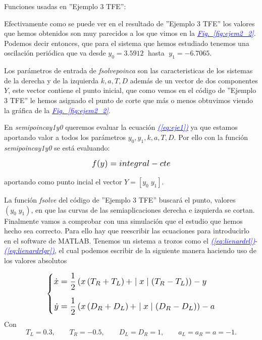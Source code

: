 \documentclass[12pt,a4paper]{report} %
\newcommand{\fref}[1]{\hyperref[#1]{\textcolor{blue}{\textit{Fig.~\ref*{#1}}}}}
\newcommand{\eref}[1]{\hyperref[#1]{\textcolor{blue}{\textit{(\ref*{#1})}}}}
\begin{document}
	\vspace{1cm}\noindent Funciones usadas en ''Ejemplo 3 TFE'':
	\vspace{0.5cm}
	\vspace{0.5cm}
	\newpage
	
	Efectivamente como se puede ver en el resultado de ''Ejemplo 3 TFE'' los valores que hemos obtenidos son muy parecidos a los que vimos en la \fref{fig:ejem2_2}. Podemos decir entonces, que para el sistema que hemos estudiado tenemos una oscilación periódica que va desde $y_0=3.5912\;$ hasta $\; y_1=-6.7065$.

	
	\vspace{0.5cm}Los parámetros de entrada de \textit{fsolvepoinca} son las caracteristicas de los sistemas de la derecha y de la izquierda $k,a,T,D$ además de un vector de dos componentes $Y$, este vector contiene el punto inicial, que como vemos en el código de ''Ejemplo 3 TFE'' le hemos asignado el punto de corte que más o menos obtuvimos viendo la gráfica de la \fref{fig:ejem2_2}.
	
	\vspace{0.5cm}En \textit{semipoincay1y0} queremos evaluar la ecuación \eref{eq:eje1} ya que estamos aportando valor a todos los parámetros $y_0,y_1,k,a,T,D$. Por ello con la función \textit{semipoincay1y0} se está evaluando:
	
	\begin{equation}
		\label{eq:eje4}
		\scalebox{1.2}{$\displaystyle
			f(y)=integral - cte
			$}
	\end{equation}\smallskip
	
	\noindent aportando como punto incial el vector $Y=\left[ y_0 \; y_1 \right]$. 
	
	\vspace{0.5cm}La función \textit{fsolve} del código de ''Ejemplo 3 TFE'' buscará el punto, valores $\left(y_0\; y_1\right)$, en que las curvas de las semiaplicaciones derecha e izquierda se cortan.
	\newpage
	Finalmente vamos a comprobar con una simulación que el estudio que hemos hecho sea correcto. Para ello hay que reescribir las ecuaciones para introducirlo en el software de MATLAB. Tenemos un sistema a trozos como el \eref{eq:lienardrl}-\eref{eq:lienardrlgr}, el cual podemos escribir de la siguiente manera haciendo uso de los valores absolutos
	
	\begin{equation}
		\label{eq:clejem}
		\scalebox{1.2}{$\displaystyle
			\left\{
			\begin{aligned}
			\dot{x}&=\frac{1}{2}\left( x\left(T_R+T_L\right)+\mid x\mid \left(T_R-T_L\right)\right)-y
				 \\[2mm]
			\dot{y}&=\frac{1}{2}\left( x\left(D_R+D_L\right)+\mid x\mid \left(D_R-D_L\right)\right)-a
			\end{aligned}
			\right. 
			$}
	\end{equation}\smallskip
	\noindent Con
	\begin{equation*}
		T_L=0.3, \qquad T_R=-0.5, \qquad D_L=D_R=1, \qquad a_L=a_R=a=-1.
	\end{equation*}\smallskip
	
\end{document}
